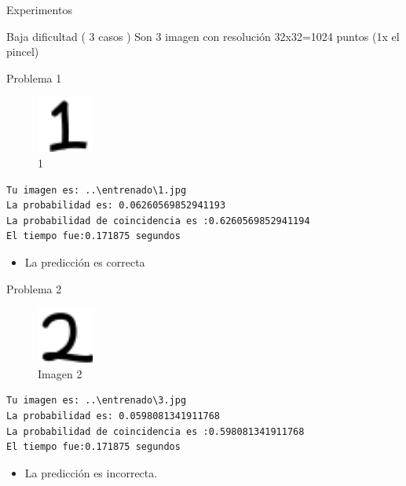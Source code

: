 \documentclass[
  spanish,
  ignorenonframetext,
]{beamer}
\providecommand{\tightlist}{%
  \setlength{\itemsep}{0pt}\setlength{\parskip}{0pt}}
\begin{document}
\begin{frame}[fragile]{Experimentos}
\protect\hypertarget{experimentos}{}
\begin{block}{Baja dificultad ( 3 casos )}
\protect\hypertarget{baja-dificultad-3-casos}{}
Son 3 imagen con resolución 32x32=1024 puntos (1x el pincel)

\begin{block}{Problema 1}
\protect\hypertarget{problema-1}{}
\begin{figure}
\centering
\includegraphics[width=0.72917in,height=\textheight]{img/README/1-16526373701691.png}
\caption{1}
\end{figure}

\begin{verbatim}
Tu imagen es: ..\entrenado\1.jpg
La probabilidad es: 0.06260569852941193
La probabilidad de coincidencia es :0.6260569852941194
El tiempo fue:0.171875 segundos
\end{verbatim}

\begin{itemize}
\tightlist
\item
  La predicción es correcta
\end{itemize}
\end{block}

\begin{block}{Problema 2}
\protect\hypertarget{problema-2}{}
\begin{figure}
\centering
\includegraphics[width=0.72917in,height=\textheight]{documentacion/img/2.png}
\caption{Imagen 2}
\end{figure}

\begin{verbatim}
Tu imagen es: ..\entrenado\3.jpg
La probabilidad es: 0.0598081341911768
La probabilidad de coincidencia es :0.598081341911768
El tiempo fue:0.171875 segundos
\end{verbatim}

\begin{itemize}
\tightlist
\item
  La predicción es incorrecta.
\end{itemize}
\end{block}


\end{block}
\end{frame}
\end{document}
